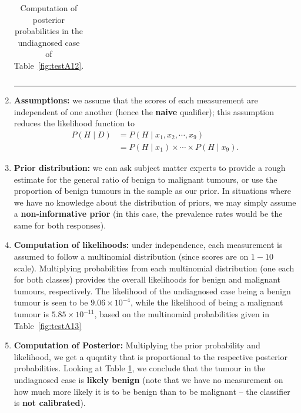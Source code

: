 \begin{enumerate}
\begin{table}[!t]
\begin{tabular}{c c c c c}
        \hline
        \end{tabular}
        \caption[\small Computation of posterior probabilities in the undiagnosed case]{\small Computation of posterior probabilities in the undiagnosed case of Table~\ref{fig:testA12}.}
        \label{tab:SA9}\hrule
     \end{table}  
    \item \textbf{Assumptions:} we assume that the scores of each measurement are independent of one another (hence the \textbf{naive} qualifier); this assumption reduces the likelihood function to
    \begin{align*}
        P(H\mid D)&=P(H\mid x_{1},x_{2},\cdots,x_{9})\\&=P(H\mid x_{1})\times \cdots\times P(H\mid x_{9}).
    \end{align*}
    \item \textbf{Prior distribution:} we can ask subject matter experts to provide a rough estimate for the general ratio of benign to malignant tumours, or use the proportion of benign tumours in the sample as our prior. In situations where we have no knowledge about the distribution of priors, we may simply assume a \textbf{non-informative prior} (in this case, the prevalence rates would be the same for both responses). 
    
    \item \textbf{Computation of likelihoods:} under independence, each measurement is assumed to follow a multinomial distribution (since scores are on $1-10$ scale). Multiplying probabilities from each multinomial distribution (one each for both classes) provides the overall likelihoods for benign and malignant tumours, respectively. The likelihood of the undiagnosed case being a benign tumour is seen to be $9.06\times 10^{-4}$, while the likelihood of being a malignant tumour is $5.85\times 10^{-11}$, based on the multinomial probabilities given in Table~\ref{fig:testA13}
    

    
    
    \item \textbf{Computation of Posterior:} Multiplying the prior probability and likelihood, we get a quqntity that is proportional to the respective posterior probabilities. Looking at Table \ref{tab:SA9}, we conclude that the tumour in the undiagnosed case is \textbf{likely benign} (note that we have no measurement on how much more likely it is to be benign than to be malignant -- the classifier is \textbf{not calibrated}).
    
  
        
\end{enumerate}

